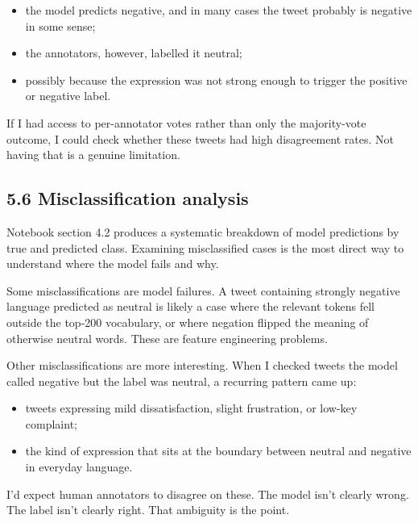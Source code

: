 \documentclass[12pt]{article}
\begin{document}
\begin{itemize}

  \item the model predicts negative, and in many cases the tweet probably is negative in some sense;

  \item the annotators, however, labelled it neutral;

  \item possibly because the expression was not strong enough to trigger the positive or negative label.

\end{itemize} If I had access to per-annotator votes rather than only the majority-vote outcome, I could check whether these tweets had high disagreement rates. Not having that is a genuine limitation.



\subsection*{5.6 Misclassification analysis}



Notebook section 4.2 produces a systematic breakdown of model predictions by true and predicted class. Examining misclassified cases is the most direct way to understand where the model fails and why.

Some misclassifications are model failures. A tweet containing strongly negative language predicted as neutral is likely a case where the relevant tokens fell outside the top-200 vocabulary, or where negation flipped the meaning of otherwise neutral words. These are feature engineering problems.

Other misclassifications are more interesting. When I checked tweets the model called negative but the label was neutral, a recurring pattern came up:

\begin{itemize}

  \item tweets expressing mild dissatisfaction, slight frustration, or low-key complaint;

  \item the kind of expression that sits at the boundary between neutral and negative in everyday language.

\end{itemize} I'd expect human annotators to disagree on these. The model isn't clearly wrong. The label isn't clearly right. That ambiguity is the point.
\end{document}
